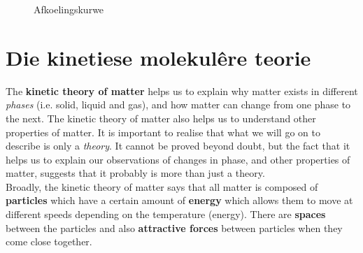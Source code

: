 \begin{minipage}{0.5\textwidth}
\begin{figure}[H]
\begin{center}
 \end{center}
\caption{Afkoelingskurwe}
\end{figure}
\end{minipage}

         \section{Die kinetiese molekul\^{e}re teorie}
    \nopagebreak

      \label{m38730*id308618}The \textbf{kinetic theory of matter} helps us to explain why matter exists in different \textsl{phases} (i.e.\@{} solid, liquid and gas), and how matter can change from one phase to the next. The kinetic theory of matter also helps us to understand other properties of matter. It is important to realise that what we will go on to describe is only a \textsl{theory}. It cannot be proved beyond doubt, but the fact that it helps us to explain our observations of changes in phase, and other properties of matter, suggests that it probably is more than just a theory.\\
      \label{m38730*id308641}Broadly, the kinetic theory of matter says that all matter is composed of \textbf{particles} which have a certain amount of \textbf{energy} which allows them to move at different speeds depending on the temperature (energy). There are \textbf{spaces} between the particles and also \textbf{attractive forces} between particles when they come close together.


